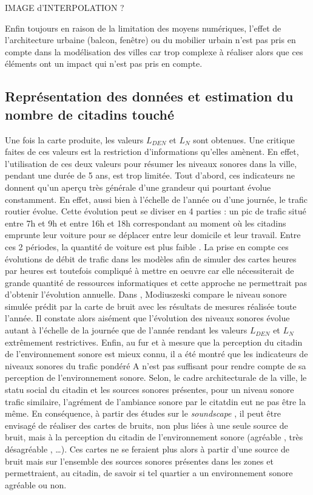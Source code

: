 IMAGE d'INTERPOLATION ?

Enfin toujours en raison de la limitation des moyens numériques, l'effet de l'architecture urbaine (balcon, fenêtre) ou du mobilier urbain n'est pas pris en compte dans la modélisation des villes car trop complexe à réaliser alors que ces éléments ont un impact qui n'est pas pris en compte. 

\subsection{Représentation des données et estimation du nombre de citadins touché}

Une fois la carte produite, les valeurs $L_{DEN}$ et $L_N$ sont obtenues. Une critique faites de ces valeurs est la restriction d'informations qu'elles amènent. En effet, l'utilisation de ces deux valeurs pour résumer les niveaux sonores dans la ville, pendant une durée de 5 ans, est trop limitée. Tout d'abord, ces indicateurs ne donnent qu'un aperçu très générale d'une grandeur qui pourtant évolue constamment. En effet, aussi bien à l'échelle de l'année ou d'une journée, le trafic routier évolue. Cette évolution peut se diviser en 4 parties : un pic de trafic situé entre 7h et 9h et entre 16h et 18h correspondant au moment où les citadins emprunte leur voiture pour se déplacer entre leur domicile et leur travail. Entre ces 2 périodes, la quantité de voiture est plus faible \cite{}. La prise en compte ces évolutions de débit de trafic dans les modèles afin de simuler des cartes heures par heures est toutefois compliqué à mettre en oeuvre car elle nécessiterait de grande quantité de ressources informatiques et cette approche ne permettrait pas d'obtenir l'évolution annuelle. Dans \cite{modiuszeski}, Modiuszeski compare le niveau sonore simulée prédit par la carte de bruit avec les résultats de mesures réalisée toute l'année. Il constate alors aisément que l'évolution des niveaux sonores évolue autant à l'échelle de la journée que de l'année rendant les valeurs $L_{DEN}$ et $L_N$ extrêmement restrictives. Enfin, au fur et à mesure que la perception du citadin de l'environnement sonore est mieux connu, il a été montré que les indicateurs de niveaux sonores du trafic pondéré A n'est pas suffisant pour rendre compte de sa perception de l'environnement sonore. Selon, le cadre architecturale de la ville, le statu social du citadin et les sources sonores présentes, pour un niveau sonore trafic similaire, l'agrément de l'ambiance sonore par le citatdin eut ne pas être la même. En conséquence, à partir des études sur le \textit{soundscape} \cite{schafer_soundscape_1993}, il peut être envisagé de réaliser des cartes de bruits, non plus liées à une seule source de bruit, mais à la perception du citadin de l'environnement sonore (\og agréable \fg{}, \og très désagréable \fg{}, \dots). Ces cartes ne se feraient plus alors à partir d'une source de bruit mais sur l'ensemble des sources sonores présentes dans les zones et permettraient, au citadin, de savoir si tel quartier a un environnement sonore agréable ou non.\\

